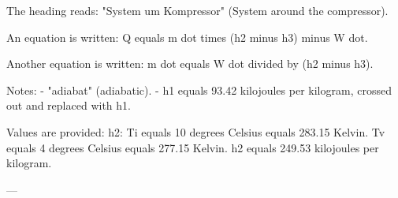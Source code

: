 The heading reads: "System um Kompressor" (System around the compressor).  

An equation is written:  
Q equals m dot times (h2 minus h3) minus W dot.  

Another equation is written:  
m dot equals W dot divided by (h2 minus h3).  

Notes:  
- "adiabat" (adiabatic).  
- h1 equals 93.42 kilojoules per kilogram, crossed out and replaced with h1.  

Values are provided:  
h2: Ti equals 10 degrees Celsius equals 283.15 Kelvin.  
Tv equals 4 degrees Celsius equals 277.15 Kelvin.  
h2 equals 249.53 kilojoules per kilogram.  

---